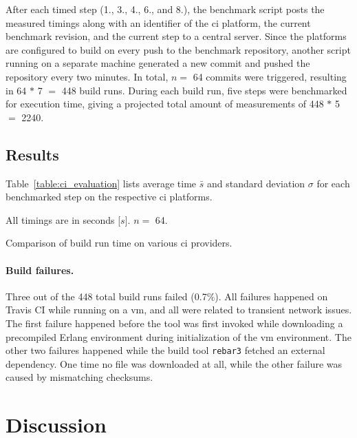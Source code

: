 After each timed step (1., 3., 4., 6., and 8.), the benchmark script posts the measured timings along with an identifier of the \acrshort{ci} platform, the current benchmark revision, and the current step to a central server. Since the platforms are configured to build on every push to the benchmark repository, another script running on a separate machine generated a new commit and pushed the repository every two minutes. In total, $n=$ 64 commits were triggered, resulting in 64 $*$ 7 $=$ 448 build runs. During each build run, five steps were benchmarked for execution time, giving a projected total amount of measurements of 448 $*$ 5 $=$ 2240.

\cleardoublepage
\subsection{Results}
Table~\ref{table:ci_evaluation} lists average time $\bar{s}$ and standard deviation $\sigma$ for each benchmarked step on the respective \acrshort{ci} platforms.

\begin{table}[h]
  \setlength{\tabcolsep}{8.6pt}
  \renewcommand{\arraystretch}{1.5}
  \centering
  
  \vspace{6pt}
  All timings are in seconds [$s$]. $n=$ 64.

  \caption{Comparison of build run time on various \acrshort{ci} providers.}\label{table:ci_evaluation}
\end{table}

\paragraph{Build failures.} Three out of the 448 total build runs failed (0.7$\%$). All failures happened on Travis CI while running on a \acrshort{vm}, and all were related to transient network issues. The first failure happened before the tool was first invoked while downloading a precompiled Erlang environment during initialization of the \acrshort{vm} environment.
The other two failures happened while the build tool \lstinline|rebar3| fetched an external dependency. One time no file was downloaded at all, while the other failure was caused by mismatching checksums.

\cleardoublepage
\section{Discussion}

